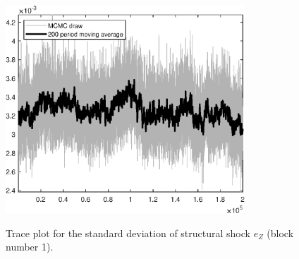 \begin{figure}[H]
\centering
  \includegraphics[width=0.8\textwidth]{RBC_growth/graphs/TracePlot_SE_e_Z_blck_1}\\
    \caption{Trace plot for the standard deviation of structural shock ${e_Z}$ (block number 1).}
\end{figure}
